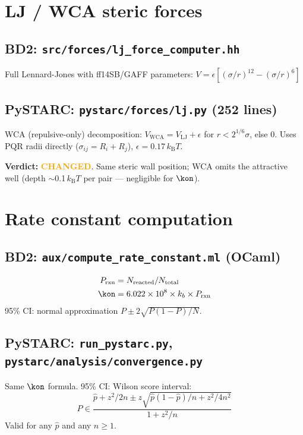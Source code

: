 \documentclass[11pt]{article}
\newcommand{\kBT}{k_{\mathrm{B}}T}
\newcommand{\changed}{\textcolor{Orange}{\textbf{CHANGED}}}
\begin{document}
\section{LJ / WCA steric forces}

\subsection{BD2: \texttt{src/forces/lj\_force\_computer.hh}}
Full Lennard-Jones with ff14SB/GAFF parameters:
$V = \epsilon[(\sigma/r)^{12} - (\sigma/r)^6]$

\subsection{PySTARC: \texttt{pystarc/forces/lj.py} (252 lines)}
WCA (repulsive-only) decomposition:
$V_\mathrm{WCA} = V_\mathrm{LJ} + \epsilon$ for $r < 2^{1/6}\sigma$, else 0.
Uses PQR radii directly ($\sigma_{ij} = R_i + R_j$),
$\epsilon = 0.17\,\kBT$.

\textbf{Verdict:} \changed. Same steric wall position; WCA omits
the attractive well (depth $\sim$0.1\,$\kBT$ per pair --- negligible for $\kon$).


\section{Rate constant computation}

\subsection{BD2: \texttt{aux/compute\_rate\_constant.ml} (OCaml)}
\begin{align}
P_\mathrm{rxn} &= N_\mathrm{reacted} / N_\mathrm{total} \\
\kon &= 6.022 \times 10^8 \times k_b \times P_\mathrm{rxn}
\end{align}
95\% CI: normal approximation $P \pm 2\sqrt{P(1-P)/N}$.

\subsection{PySTARC: \texttt{run\_pystarc.py}, \texttt{pystarc/analysis/convergence.py}}
Same $\kon$ formula. 95\% CI: Wilson score interval:
\begin{equation}
P \in \frac{\hat{p} + z^2/2n \pm z\sqrt{\hat{p}(1-\hat{p})/n + z^2/4n^2}}{1 + z^2/n}
\end{equation}
Valid for any $\hat{p}$ and any $n \ge 1$.
\end{document}
